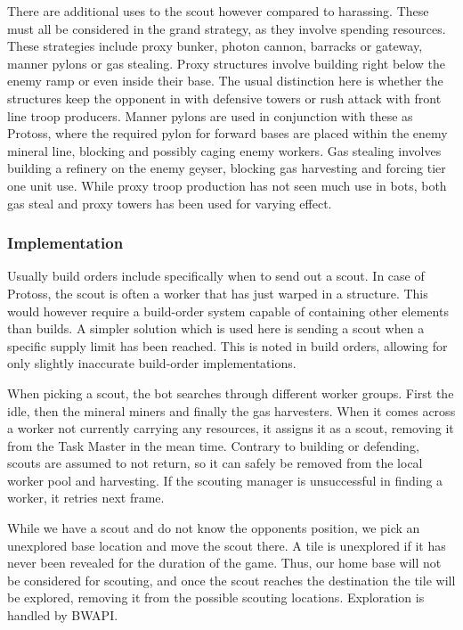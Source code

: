 	There are additional uses to the scout however compared to harassing. These must all be considered in the grand strategy, as they involve spending resources. These strategies include proxy bunker, photon cannon, barracks or gateway, manner pylons or gas stealing. Proxy structures involve building right below the enemy ramp or even inside their base. The usual distinction here is whether the structures keep the opponent in with defensive towers or rush attack with front line troop producers. Manner pylons are used in conjunction with these as Protoss, where the required pylon for forward bases are placed within the enemy mineral line, blocking and possibly caging enemy workers. Gas stealing involves building a refinery on the enemy geyser, blocking gas harvesting and forcing tier one unit use. While proxy troop production has not seen much use in bots, both gas steal and proxy towers has been used for varying effect.
	
		\subsubsection{Implementation}
		Usually build orders include specifically when to send out a scout. In case of Protoss, the scout is often a worker that has just warped in a structure. This would however require a build-order system capable of containing other elements than builds. A simpler solution which is used here is sending a scout when a specific supply limit has been reached. This is noted in build orders, allowing for only slightly inaccurate build-order implementations.
		
		When picking a scout, the bot searches through different worker groups. First the idle, then the mineral miners and finally the gas harvesters. When it comes across a worker not currently carrying any resources, it assigns it as a scout, removing it from the Task Master in the mean time. Contrary to building or defending, scouts are assumed to not return, so it can safely be removed from the local worker pool and harvesting. If the scouting manager is unsuccessful in finding a worker, it retries next frame.
		
		While we have a scout and do not know the opponents position, we pick an unexplored base location and move the scout there. A tile is unexplored if it has never been revealed for the duration of the game. Thus, our home base will not be considered for scouting, and once the scout reaches the destination the tile will be explored, removing it from the possible scouting locations. Exploration is handled by BWAPI.
		

